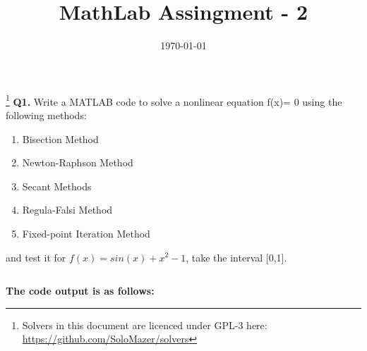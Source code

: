 \documentclass[a4paper]{article}
\date{\today}
\title{MathLab Assingment - 2}
\begin{document}
\header{}
\footnote{Solvers in this document are licenced under GPL-3 here:
	\href{https://github.com/SoloMazer/solvers}{https://github.com/SoloMazer/solvers}}
\textbf{Q1.} Write a MATLAB code to solve a nonlinear equation f(x)= 0 using the following methods:
\begin{enumerate}
	\item Bisection Method
	\item Newton-Raphson Method
	\item Secant Methods
	\item Regula-Falsi Method
	\item Fixed-point Iteration Method
\end{enumerate}
and test it for $f(x) = sin(x) + x^2 - 1$, take the interval [0,1].

\begin{answer}{}
	\inputminted[linenos]{cpp}{/home/solomazer/devel/solvers/bisection.cpp}
\end{answer}
\textbf{The code output is as follows:}
\end{document}
